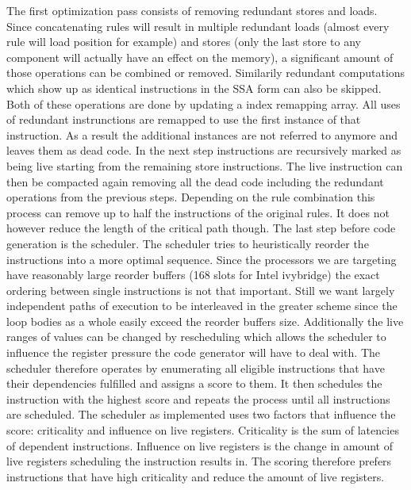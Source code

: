 The first optimization pass consists of removing redundant stores and loads. Since concatenating rules will result in multiple redundant loads (almost every rule will load position for example) and stores (only the last store to any component will actually have an effect on the memory), a significant amount of those operations can be combined or removed. Similarily redundant computations which show up as identical instructions in the SSA form can also be skipped. Both of these operations are done by updating a index remapping array. All uses of redundant instrunctions are remapped to use the first instance of that instruction. As a result the additional instances are not referred to anymore and leaves them as dead code.
In the next step instructions are recursively marked as being live starting from the remaining store instructions. The live instruction can then be compacted again removing all the dead code including the redundant operations from the previous steps. Depending on the rule combination this process can remove up to half the instructions of the original rules. It does not however reduce the length of the critical path though.
The last step before code generation is the scheduler. The scheduler tries to heuristically reorder the instructions into a more optimal sequence. Since the processors we are targeting have reasonably large reorder buffers (168 slots for Intel ivybridge) the exact ordering between single instructions is not that important. Still we want largely independent paths of execution to be interleaved in the greater scheme since the loop bodies as a whole easily exceed the reorder buffers size. Additionally the live ranges of values can be changed by rescheduling which allows the scheduler to influence the register pressure the code generator will have to deal with.
The scheduler therefore operates by enumerating all eligible instructions that have their dependencies fulfilled and assigns a score to them. It then schedules the instruction with the highest score and repeats the process until all instructions are scheduled. The scheduler as implemented uses two factors that influence the score: criticality and influence on live registers. Criticality is the sum of latencies of dependent instructions. Influence on live registers is the change in amount of live registers scheduling the instruction results in. The scoring therefore prefers instructions that have high criticality and reduce the amount of live registers.

